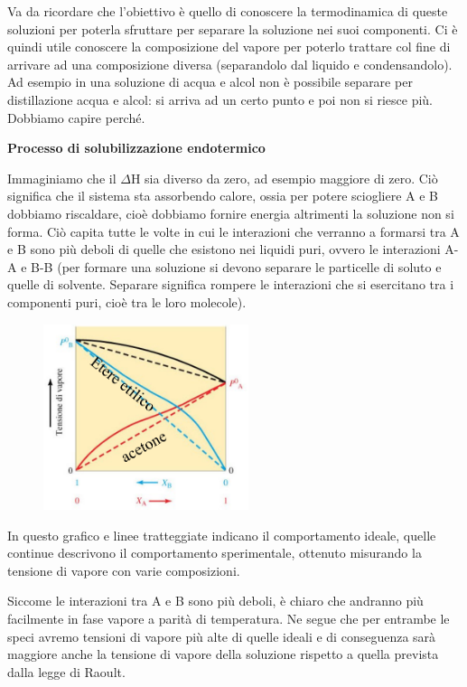 Va da ricordare che l'obiettivo è quello di conoscere la termodinamica di queste soluzioni per poterla sfruttare per separare la soluzione nei suoi componenti. Ci è quindi utile conoscere la composizione del vapore per poterlo trattare col fine di arrivare ad una composizione diversa (separandolo dal liquido e condensandolo). Ad esempio in una soluzione di acqua e alcol non è possibile separare per distillazione acqua e alcol: si arriva ad un certo punto e poi non si riesce più. Dobbiamo capire perché.

\vspace{0.2cm}\textbf{Processo di solubilizzazione endotermico}

Immaginiamo che il $\Delta$H sia diverso da zero, ad esempio maggiore di zero. Ciò significa che il sistema sta assorbendo calore, ossia per potere sciogliere A e B dobbiamo riscaldare, cioè dobbiamo fornire energia altrimenti la soluzione non si forma. Ciò capita tutte le volte in cui le interazioni che verranno a formarsi tra A e B sono più deboli di quelle che esistono nei liquidi puri, ovvero le interazioni A-A e B-B (per formare una soluzione si devono separare le particelle di soluto e quelle di solvente. Separare significa rompere le interazioni che si esercitano tra i componenti puri, cioè tra le loro molecole). 

\vspace{-0.3cm}\begin{minipage}{0.4\textwidth}
    \begin{figure}[H]
        \includegraphics[width=6cm]{immagini/tensione_di_vapore_sol_endotermica.png}
    \end{figure}
\end{minipage}
\begin{minipage}{0.6\textwidth}

\vspace{0.4cm}In questo grafico e linee tratteggiate indicano il comportamento ideale, quelle continue descrivono il comportamento sperimentale, ottenuto misurando la tensione di vapore con varie composizioni.

Siccome le interazioni tra A e B sono più deboli, è chiaro che andranno più facilmente in fase vapore a parità di temperatura. Ne segue che per entrambe le speci avremo tensioni di vapore più alte di quelle ideali e di conseguenza sarà maggiore anche la tensione di vapore della soluzione rispetto a quella prevista dalla legge di Raoult.
\end{minipage}

